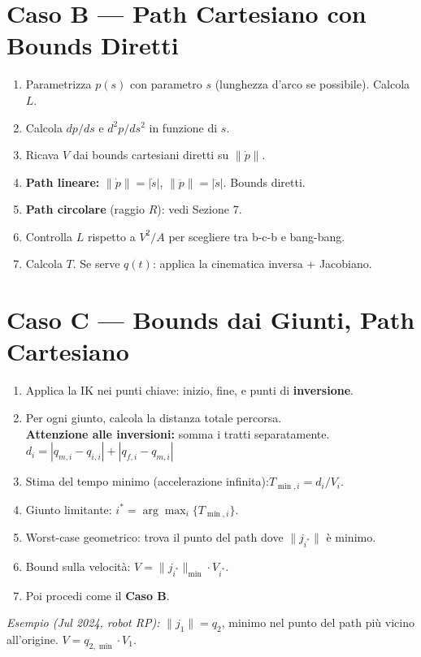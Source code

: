 \documentclass[10pt,a4paper]{article}
\newcommand{\dt}{\dot{s}}
\newcommand{\ddt}{\ddot{s}}
\begin{document}
\section{Caso B --- Path Cartesiano con Bounds Diretti}

\begin{greenbox}
\begin{enumerate}
  \item Parametrizza $p(s)$ con parametro $s$ (lunghezza d'arco se possibile). Calcola $L$.
  \item Calcola $dp/ds$ e $d^2p/ds^2$ in funzione di $s$.
  \item Ricava $V$ dai bounds cartesiani diretti su $\|\dot{p}\|$.
  \item \textbf{Path lineare:} $\|\dot{p}\| = |\dt|$, $\|\ddot{p}\| = |\ddt|$. Bounds diretti.
  \item \textbf{Path circolare} (raggio $R$): vedi Sezione 7.
  \item Controlla $L$ rispetto a $V^2/A$ per scegliere tra b-c-b e bang-bang.
  \item Calcola $T$. Se serve $q(t)$: applica la cinematica inversa + Jacobiano.
\end{enumerate}
\end{greenbox}

\section{Caso C --- Bounds dai Giunti, Path Cartesiano}

\begin{purplebox}
\begin{enumerate}
  \item Applica la IK nei punti chiave: inizio, fine, e punti di \textbf{inversione}.
  \item Per ogni giunto, calcola la distanza totale percorsa.\\
        \textbf{Attenzione alle inversioni:} somma i tratti separatamente.\\
        \hspace*{1cm} $d_i = |q_{m,i} - q_{i,i}| + |q_{f,i} - q_{m,i}|$
  \item Stima del tempo minimo (accelerazione infinita):\quad $T_{\min,i} = d_i / V_i$.
  \item Giunto limitante: $i^* = \arg\max_i\{T_{\min,i}\}$.
  \item Worst-case geometrico: trova il punto del path dove $\|j_{i^*}\|$ \`e minimo.
  \item Bound sulla velocit\`a: \quad $V = \|j_{i^*}\|_{\min} \cdot V_{i^*}$.
  \item Poi procedi come il \textbf{Caso B}.
\end{enumerate}

\smallskip
\textit{Esempio (Jul 2024, robot RP):} $\|j_1\| = q_2$, minimo nel punto del path pi\`u vicino
all'origine. \quad $V = q_{2,\min} \cdot V_1$.
\end{purplebox}
\end{document}
